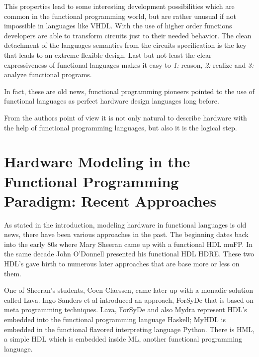 \documentclass[11pt,final,a4paper]{article}
\begin{document}
This properties lead to some interesting development possibilities which are common in the functional programming world, but are rather
unusual if not impossible in languages like VHDL\@. With the use of higher order functions developers are able to transform circuits just to
their needed behavior. The clean detachment of the languages semantics from the circuits specification is the key that leads to an extreme
flexible design. Last but not least the clear expressiveness of functional languages makes it easy to \emph{1:} reason, \emph{2:} realize
and \emph{3:} analyze functional programs. %

In fact, these are old news, functional programming pioneers pointed to the use of functional languages as perfect hardware design languages
long before. \cite{sheeran:perfect_match} %

From the authors point of view it is not only natural to describe hardware with the help of functional programming languages, 
but also it is the logical step. 

\section{Hardware Modeling in the Functional Programming Paradigm: Recent Approaches}
\label{recent_approaches}
As stated in the introduction, modeling hardware in functional languages is old news, there have been various approaches in the past. The
beginning dates back into the early 80s where Mary Sheeran came up with a functional HDL muFP\cite{sheeran:muFP}. In the same decade John
O'Donnell presented his functional HDL HDRE\cite{hydra:old,donnell}. These two HDL's gave birth to numerous later approaches that are base
more or less on them. 

One of Sheeran's students, Coen Claessen, came later up with a monadic solution called Lava\cite{claessen:hardware}. Ingo Sanders et al
introduced an approach, ForSyDe \cite{forsyde:phd,forsyde:ieee} that is based on meta programming techniques. Lava, ForSyDe and also Mydra %
represent HDL's embedded into the functional programming language Haskell; MyHDL \cite{myhdl} is embedded in the functional flavored
interpreting language Python. There is HML\cite{hml}, a simple HDL which is embedded inside ML, another functional programming language. 
\end{document}
